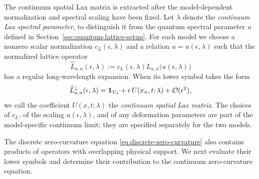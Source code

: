 The continuum spatial Lax matrix is extracted after the model-dependent
normalization and spectral scaling have been fixed.  Let $\lambda$ denote the
\emph{continuum Lax spectral parameter}, to distinguish it from the quantum
spectral parameter $u$ defined in Section~\ref{sec:quantum-lattice-setup}.
For each model we choose a nonzero scalar normalization
$c_L(\epsilon,\lambda)$ and a relation $u=u(\epsilon,\lambda)$ such that the
normalized lattice operator
\begin{equation}
\widehat L_{a,n}(\epsilon,\lambda)
:=
c_L(\epsilon,\lambda)
L_{a,n}\bigl(u(\epsilon,\lambda)\bigr)
\label{eq:normalized-lattice-Lax}
\end{equation}
has a regular long-wavelength expansion.  When its lower symbol takes the
form
\begin{equation}
\widehat L_{a,n}^{\downarrow}(\epsilon,\lambda)
=
\mathbf{1}_{\mathcal V_a}
+\epsilon\,U(x_n,t;\lambda)
+\mathcal O(\epsilon^2),
\label{eq:continuum-spatial-Lax-definition}
\end{equation}
we call the coefficient $U(x,t;\lambda)$ the \emph{continuum spatial Lax
matrix}.  The choices of $c_L$, of the scaling $u(\epsilon,\lambda)$, and of
any deformation parameters are part of the model-specific continuum limit;
they are specified separately for the two models.

The discrete zero-curvature equation \eqref{eq:discrete-zero-curvature}
also contains products of operators with overlapping physical support.
We next evaluate their lower symbols and determine their contribution to
the continuum zero-curvature equation.
